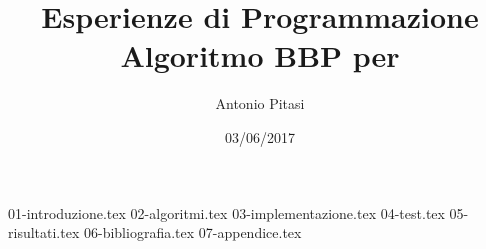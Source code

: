 \documentclass{article}
\title{Esperienze di Programmazione \\
\large Algoritmo BBP per \p
}
\author{Antonio Pitasi}
\date{03/06/2017}
\begin{document}
\maketitle

{01-introduzione.tex}
{02-algoritmi.tex}
{03-implementazione.tex}
{04-test.tex}
{05-risultati.tex}
{06-bibliografia.tex}
{07-appendice.tex}
\end{document}
